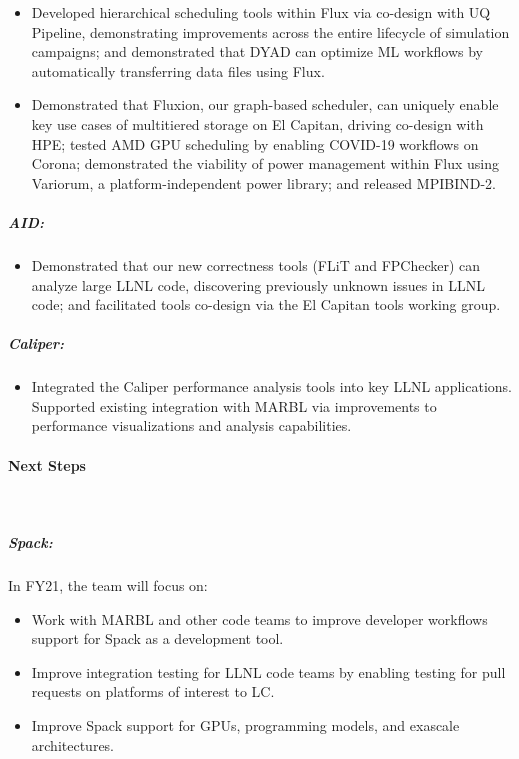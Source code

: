 \begin{itemize}

\item Developed hierarchical scheduling tools within Flux via co-design with UQ Pipeline, demonstrating improvements across the entire lifecycle of simulation campaigns; and demonstrated that DYAD can optimize ML workflows by automatically transferring data files using Flux. 
\item Demonstrated that Fluxion, our graph-based scheduler, can uniquely enable key use cases of multitiered storage on El Capitan, driving co-design with HPE; tested AMD GPU scheduling by enabling COVID-19 workflows on Corona; demonstrated the viability of power management within Flux using Variorum, a platform-independent power library; and released MPIBIND-2. 


\end{itemize}

\subparagraph{AID:}
\begin{itemize}

\item Demonstrated that our new correctness tools (FLiT and FPChecker) can analyze large LLNL code, discovering previously unknown issues in LLNL code; and facilitated tools co-design via the El Capitan tools working group. 


\end{itemize}

\subparagraph{Caliper:}
\begin{itemize}
\item Integrated the Caliper performance analysis tools into key LLNL applications. Supported existing integration with MARBL via improvements to performance visualizations and analysis capabilities.
\end{itemize}


\paragraph{Next Steps} \leavevmode \\

\subparagraph{Spack:}
In FY21, the team will focus on:

\begin{itemize}
    \item Work with MARBL and other code teams to improve developer workflows support for Spack as a development tool.
    \item Improve integration testing for LLNL code teams by enabling testing for pull requests on platforms of interest to LC.
    \item Improve Spack support for GPUs, programming models, and exascale architectures.
\end{itemize}

